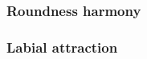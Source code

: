 
\subsubsection{Roundness harmony}

\subsubsection{Labial attraction}

\citet{Zuraw2000}
\citet{Clements1982}
\citet{Inkelas1997}
